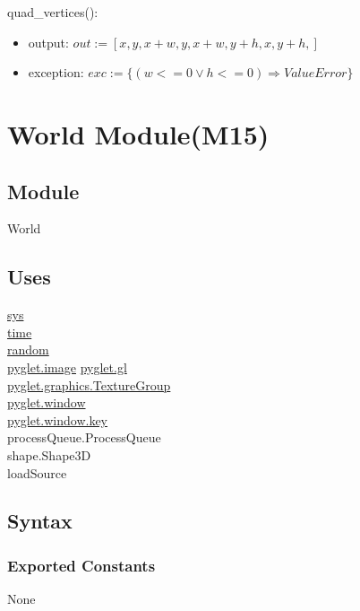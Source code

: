 \documentclass{article}
\begin{document}
\noindent quad\_vertices():
\begin{itemize}
\item output: $out:=[x,y,x+w,y,x+w,y+h,x,y+h,]$
\item exception: $exc:=\{(w<=0\lor h<=0) \Rightarrow ValueError\}$
\end{itemize}\vspace{6mm}

\newpage


\section {World Module(M15)}

\subsection{Module}
World

\subsection {Uses}
\href{https://docs.python.org/3/library/sys.html}{sys}\\
\href{https://docs.python.org/3/library/time.html}{time}\\
\href{https://docs.python.org/3/library/random.html}{random}\\
\href{https://pyglet.readthedocs.io/en/latest/modules/image/index.html}{pyglet.image} 
\href{https://pyglet.readthedocs.io/en/latest/modules/gl.html}{pyglet.gl}\\
\href{https://pyglet.readthedocs.io/en/latest/modules/graphics/#pyglet.graphics.TextureGroup}{pyglet.graphics.TextureGroup}\\
\href{https://pyglet.readthedocs.io/en/latest/modules/window.html}{pyglet.window}\\
\href{https://pyglet.readthedocs.io/en/latest/modules/window_key.html}{pyglet.window.key}\\
processQueue.ProcessQueue\\
shape.Shape3D\\
loadSource

\subsection {Syntax}

\subsubsection {Exported Constants}
None
\end{document}
